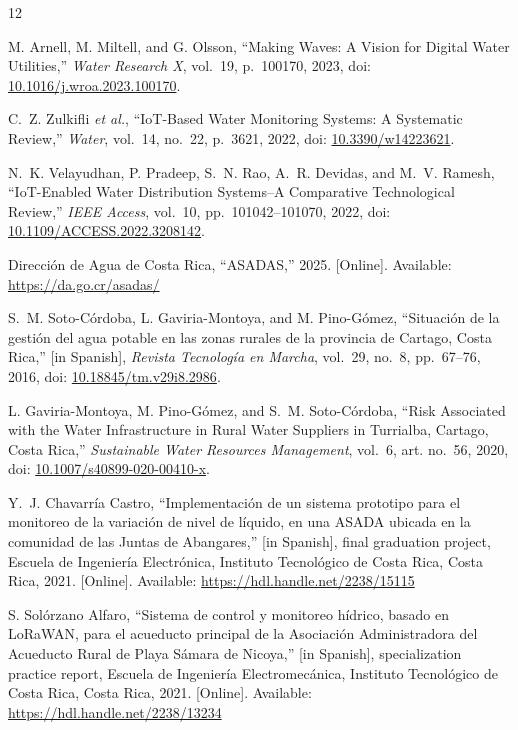 \documentclass[conference]{IEEEtran}
\begin{document}
\begin{thebibliography}{12}

M. Arnell, M. Miltell, and G. Olsson, ``Making Waves: A Vision for Digital Water Utilities,'' \emph{Water Research X}, vol.~19, p.~100170, 2023, doi: \url{10.1016/j.wroa.2023.100170}.

C.~Z. Zulkifli \emph{et al.}, ``IoT-Based Water Monitoring Systems: A Systematic Review,'' \emph{Water}, vol.~14, no.~22, p.~3621, 2022, doi: \url{10.3390/w14223621}.

N.~K. Velayudhan, P. Pradeep, S.~N. Rao, A.~R. Devidas, and M.~V. Ramesh, ``IoT-Enabled Water Distribution Systems--A Comparative Technological Review,'' \emph{IEEE Access}, vol.~10, pp.~101042--101070, 2022, doi: \url{10.1109/ACCESS.2022.3208142}.

Direcci\'{o}n de Agua de Costa Rica, ``ASADAS,'' 2025. [Online]. Available: \url{https://da.go.cr/asadas/}

S.~M. Soto-C\'{o}rdoba, L. Gaviria-Montoya, and M. Pino-G\'{o}mez, ``Situaci\'{o}n de la gesti\'{o}n del agua potable en las zonas rurales de la provincia de Cartago, Costa Rica,'' [in Spanish], \emph{Revista Tecnolog\'{i}a en Marcha}, vol.~29, no.~8, pp.~67--76, 2016, doi: \url{10.18845/tm.v29i8.2986}.

L. Gaviria-Montoya, M. Pino-G\'{o}mez, and S.~M. Soto-C\'{o}rdoba, ``Risk Associated with the Water Infrastructure in Rural Water Suppliers in Turrialba, Cartago, Costa Rica,'' \emph{Sustainable Water Resources Management}, vol.~6, art. no.~56, 2020, doi: \url{10.1007/s40899-020-00410-x}.

Y.~J. Chavarr\'{i}a Castro, ``Implementaci\'{o}n de un sistema prototipo para el monitoreo de la variaci\'{o}n de nivel de l\'{i}quido, en una ASADA ubicada en la comunidad de las Juntas de Abangares,'' [in Spanish], final graduation project, Escuela de Ingenier\'{i}a Electr\'{o}nica, Instituto Tecnol\'{o}gico de Costa Rica, Costa Rica, 2021. [Online]. Available: \url{https://hdl.handle.net/2238/15115}

S. Sol\'{o}rzano Alfaro, ``Sistema de control y monitoreo h\'{i}drico, basado en LoRaWAN, para el acueducto principal de la Asociaci\'{o}n Administradora del Acueducto Rural de Playa S\'{a}mara de Nicoya,'' [in Spanish], specialization practice report, Escuela de Ingenier\'{i}a Electromec\'{a}nica, Instituto Tecnol\'{o}gico de Costa Rica, Costa Rica, 2021. [Online]. Available: \url{https://hdl.handle.net/2238/13234}


\end{thebibliography}
\end{document}
